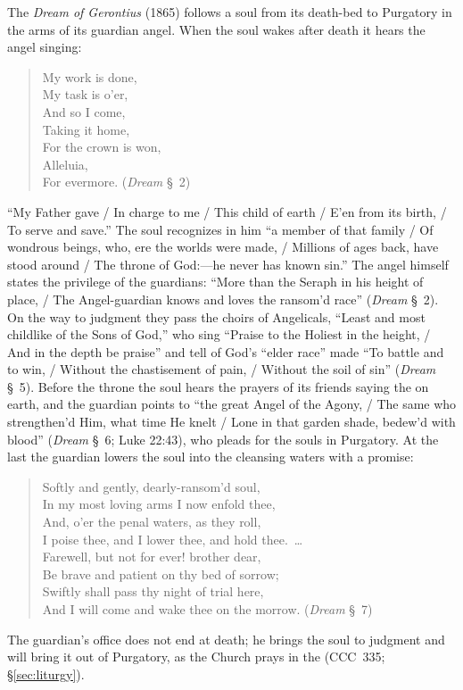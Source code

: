 The \emph{Dream of Gerontius} (1865) follows a soul from its death-bed to
Purgatory in the arms of its guardian angel. When the soul wakes after
death it hears the angel singing:
\begin{quote}
My work is done,\\
My task is o'er,\\
And so I come,\\
Taking it home,\\
For the crown is won,\\
Alleluia,\\
For evermore. (\emph{Dream} \S~2)
\end{quote}
``My Father gave / In charge to me / This child of earth / E'en from its
birth, / To serve and save.'' The soul recognizes in him ``a member of that
family / Of wondrous beings, who, ere the worlds were made, / Millions of
ages back, have stood around / The throne of God:---he never has known
sin.'' The angel himself states the privilege of the guardians: ``More than the Seraph
in his height of place, / The Angel-guardian knows and loves the ransom'd
race'' (\emph{Dream} \S~2). On the way to judgment they pass the choirs of Angelicals,
``Least and most childlike of the Sons of God,'' who sing ``Praise to the
Holiest in the height, / And in the depth be praise'' and tell of God's
``elder race'' made ``To battle and to win, / Without the chastisement of
pain, / Without the soil of sin'' (\emph{Dream} \S~5). Before the throne the soul hears
the prayers of its friends saying the  on earth, and the
guardian points to ``the great Angel of the Agony, / The same who
strengthen'd Him, what time He knelt / Lone in that garden shade, bedew'd
with blood'' (\emph{Dream} \S~6; Luke 22:43), who pleads for the souls in Purgatory. At
the last the guardian lowers the soul into the cleansing waters with a
promise:
\begin{quote}
Softly and gently, dearly-ransom'd soul,\\
In my most loving arms I now enfold thee,\\
And, o'er the penal waters, as they roll,\\
I poise thee, and I lower thee, and hold thee.~\dots\\
Farewell, but not for ever! brother dear,\\
Be brave and patient on thy bed of sorrow;\\
Swiftly shall pass thy night of trial here,\\
And I will come and wake thee on the morrow. (\emph{Dream} \S~7)
\end{quote}
The guardian's office does not end at death; he brings the soul to
judgment and will bring it out of Purgatory, as the Church prays in the
 (CCC~335; \S\ref{sec:liturgy}).

